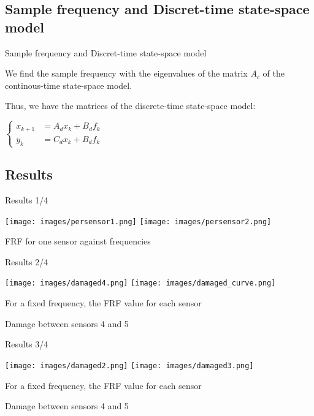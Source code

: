 \documentclass{beamer}
\begin{document}
\subsection{Sample frequency and Discret-time state-space model}
\begin{frame}{Sample frequency and Discret-time state-space model}

We find the sample frequency with the eigenvalues of the matrix $A_c$ of the continous-time state-space model.

\vspace{5mm}

Thus, we have the matrices of the discrete-time state-space model:
\begin{center}
$\left\{
\begin{array}{ll}
x_{k+1} & = A_dx_k + B_df_k \\
y_k & = C_dx_k + B_df_k
\end{array}
\right.$
\end{center}

\end{frame}

\subsection{Results}
\begin{frame}{Results 1/4}
\begin{center}
\texttt{[image: images/persensor1.png]}
\hfill
\texttt{[image: images/persensor2.png]}

FRF for one sensor against frequencies
\end{center}
\end{frame}


\begin{frame}{Results 2/4}
\begin{center}
\texttt{[image: images/damaged4.png]}
\hfill
\texttt{[image: images/damaged\_curve.png]}

For a fixed frequency, the FRF value for each sensor

\vspace{5mm}

Damage between sensors 4 and 5
\end{center}

\end{frame}


\begin{frame}{Results 3/4}
\begin{center}
\texttt{[image: images/damaged2.png]}
\hfill
\texttt{[image: images/damaged3.png]}

For a fixed frequency, the FRF value for each sensor

\vspace{5mm}

Damage between sensors 4 and 5
\end{center}
\end{frame}
\end{document}
